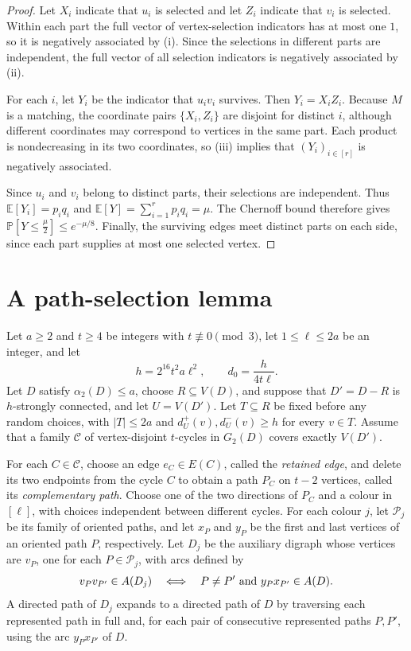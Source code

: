 \documentclass[11pt,a4paper]{article}
\theoremstyle{remark}
\numberwithin{equation}{section}
\newcommand{\Prob}{\mathbb{P}}
\newcommand{\E}{\mathbb{E}}
\newcommand{\calP}{\mathcal{P}}
\newcommand{\calC}{\mathcal{C}}
\newcommand{\al}{\alpha_2}
\begin{document}
	\begin{proof}
		Let $X_i$ indicate that $u_i$ is selected and let $Z_i$
		indicate that $v_i$ is selected.
		Within each part the full vector of vertex-selection
		indicators has at most one $1$, so it is negatively
		associated by
		\textup{(i)}.
		Since the selections in different parts are independent,
		the full vector of all selection indicators is negatively
		associated by
		\textup{(ii)}.
		
		For each $i$, let $Y_i$ be the indicator that $u_iv_i$
		survives. Then $Y_i=X_iZ_i$.
		Because $M$ is a matching, the coordinate pairs
		$\{X_i,Z_i\}$ are disjoint for distinct $i$, although
		different coordinates may correspond to vertices in
		the same part.
		Each product is nondecreasing in its two coordinates,
		so \textup{(iii)}
		implies that $(Y_i)_{i\in[r]}$ is negatively associated.
		
		Since $u_i$ and $v_i$ belong to distinct parts,
		their selections are independent.
		Thus $\E[Y_i]=p_iq_i$ and
		$\E[Y]=\sum_{i=1}^r p_iq_i=\mu$.
		The Chernoff bound therefore gives
		$
		\Prob\!\left[Y\le\frac{\mu}{2}\right]\le e^{-\mu/8}.
		$
		Finally, the surviving edges meet distinct parts
		on each side, since each part supplies at most
		one selected vertex.
	\end{proof}
	
	\section{A path-selection lemma}\label{sec:selection}
	Let $a\ge2$ and $t\ge4$ be integers with $t\not\equiv0\pmod{3}$, let $1\le\ell\le2a$ be an integer, and let
	\[
	h=2^{16}t^2a\ell^2,\qquad d_0=\frac{h}{4t\ell}.
	\]
	Let $D$ satisfy $\al(D)\le a$, choose $R\subseteq V(D)$, and suppose that $D'=D-R$ is $h$-strongly
	connected, and let $U=V(D')$.
	Let $T\subseteq R$ be fixed before any random choices, with $|T|\le2a$ and $d_U^+(v),d_U^-(v)\ge h$
	for every $v\in T$.
	Assume that a family $\calC$ of vertex-disjoint $t$-cycles in $G_2(D)$ covers exactly $V(D')$.
	
	For each $C\in\calC$, choose an edge $e_C\in E(C)$, called the \emph{retained edge}, and delete its
	two endpoints from the cycle $C$ to obtain a path $P_C$ on $t-2$ vertices,
	called its \emph{complementary path}.
	Choose one of the two directions of $P_C$ and a colour in $[\ell]$, with choices independent between
	different cycles.
	For each colour $j$, let $\calP_j$ be its family of oriented paths, and let $x_P$ and $y_P$ be the
	first and last vertices of an oriented path $P$, respectively.
	Let $D_j$ be the auxiliary digraph whose vertices are $v_P$, one for each $P\in\calP_j$, with arcs defined by
	\[
	v_Pv_{P'}\in A(D_j)
	\quad\Longleftrightarrow\quad
	P\ne P'\ \hbox{and}\ y_Px_{P'}\in A(D).
	\]
	A directed path of $D_j$ expands to a directed path of $D$ by traversing each represented path in full and, for each pair of consecutive represented paths $P,P'$, using the arc $y_Px_{P'}$ of $D$.
	
\end{document}
